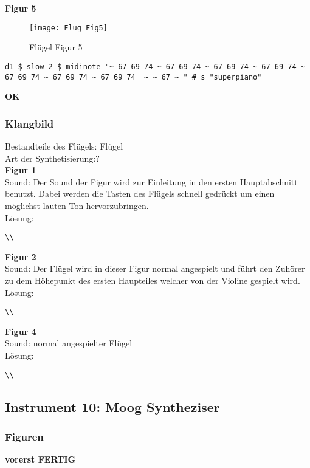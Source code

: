 \documentclass[
10pt, %
a4paper, %
oneside, %
headinclude,footinclude, %
BCOR5mm, %
]{scrartcl}
\begin{document}
\noindent \textbf{Figur 5}\\
\begin{figure}[h]
	\centering 
	\texttt{[image: Flug\_Fig5]} 
	\caption{Flügel Figur 5}
\end{figure}
\begin{lstlisting}
d1 $ slow 2 $ midinote "~ 67 69 74 ~ 67 69 74 ~ 67 69 74 ~ 67 69 74 ~ 67 69 74 ~ 67 69 74 ~ 67 69 74  ~ ~ 67 ~ " # s "superpiano"
\end{lstlisting}
{\color{green}\textbf{OK}} \\

\subsubsection{Klangbild}
Bestandteile des Flügels: Flügel\\
Art der Synthetisierung:?\\
\noindent \textbf{Figur 1}\\
Sound: Der Sound der Figur wird zur Einleitung in den ersten Hauptabschnitt benutzt. Dabei werden die Tasten des Flügels 
schnell gedrückt um einen möglichst lauten Ton hervorzubringen.\\
Lösung:\\
\begin{lstlisting}
\\
\end{lstlisting}
\noindent \textbf{Figur 2}\\
Sound: Der Flügel wird in dieser Figur normal angespielt und führt den Zuhörer zu dem Höhepunkt des ersten Haupteiles welcher von der Violine gespielt wird.\\
Lösung:\\
\begin{lstlisting}
\\
\end{lstlisting}
\noindent \textbf{Figur 4}\\
Sound: normal angespielter Flügel\\
Lösung:\\
\begin{lstlisting}
\\
\end{lstlisting}

\subsection{Instrument 10: Moog Syntheziser}
\subsubsection{Figuren}
{\color{green}\textbf{vorerst FERTIG}} \\
\end{document}
